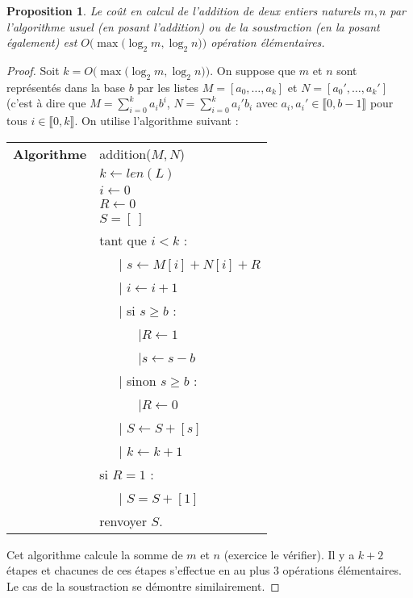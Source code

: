 \documentclass[12pt]{report}
\newtheorem{proposition}[thm]{Proposition}
\begin{document}
\begin{proposition}\label{propCout_addition}
Le coût en calcul de l'addition de deux entiers naturels $m,n$ par l'algorithme usuel (en posant l'addition) ou de la soustraction (en la posant également) est $O\big(\max\big(\log_2 m,\log_2 n)\big)$ opération élémentaires.
\end{proposition}

\begin{proof}
Soit $k=O\big(\max\big(\log_2 m,\log_2 n)\big)$. On suppose que $m$ et $n$ sont représentés dans la base $b$ par les listes $M=[a_0,\ldots,a_k]$ et $N=[a_0',\ldots,a_k']$ (c'est à dire que $M=\sum_{i=0}^k a_i b^i$, $N=\sum_{i=0}^k a_i' b_i$ avec $a_i,a_i'\in \llbracket 0,b-1\rrbracket$ pour tous $i\in \llbracket 0,k\rrbracket$.
On utilise l'algorithme suivant :


\begin{tabular}{ll}
\textbf{Algorithme } & addition($M,N$)\\
& $k\leftarrow len(L)$ \\
& $i\leftarrow 0$\\
& $R\leftarrow 0$\\
& $S=[\ ]$\\
& tant que $i<k$ :\\
& \ \ \ {\rm |} $s\leftarrow M[i]+N[i]+R$  \\
& \ \ \ {\rm |} $i\leftarrow i+1$  \\
& \ \ \ {\rm |} si $s\geq b$ :\\
& \ \ \ \ \ \ {\rm |}$R\leftarrow 1$\\
& \ \ \ \ \ \ {\rm |}$s\leftarrow s-b$\\
& \ \ \ {\rm |} sinon $s\geq b$ :\\
& \ \ \ \ \ \ {\rm |}$R\leftarrow 0$\\
& \ \ \ {\rm |} $S\leftarrow S+[s]$ \\

& \ \ \ {\rm |} $k\leftarrow k+1$  \\
& si $R=1$ : \\
& \ \ \ {\rm |} $S=S+[1]$\\
& renvoyer $S$.
\end{tabular}

Cet algorithme calcule la somme de $m$ et $n$ (exercice le vérifier). Il y a $k+2$ étapes et chacunes de ces étapes s'effectue en au plus $3$ opérations élémentaires. Le cas de la soustraction se démontre similairement.

\end{proof}
\end{document}
